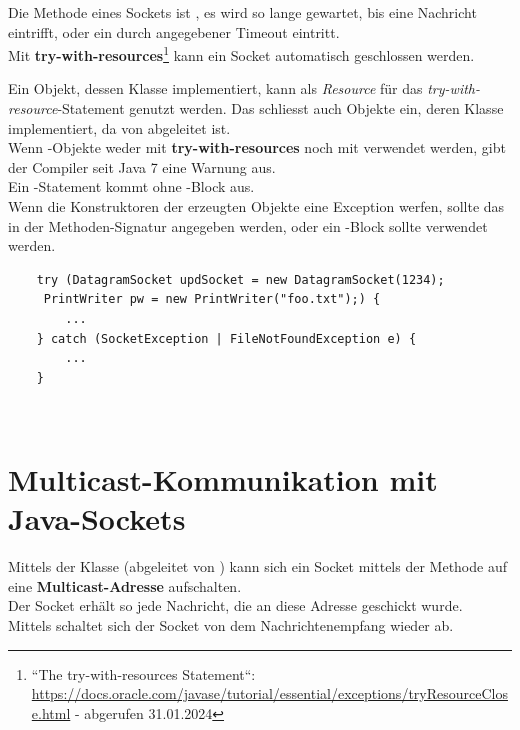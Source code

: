\noindent
Die Methode  eines Sockets ist , es wird so lange gewartet, bis eine Nachricht eintrifft, oder ein durch  angegebener Timeout eintritt.\\

\noindent
Mit \textbf{try-with-resources}\footnote{
    ``The try-with-resources Statement``: \url{https://docs.oracle.com/javase/tutorial/essential/exceptions/tryResourceClose.html} - abgerufen 31.01.2024
} kann ein Socket automatisch geschlossen werden.

\begin{tcolorbox}[enlarge top by=0.5cm,enlarge bottom by=0.5cm]
Ein Objekt, dessen Klasse  implementiert, kann als \textit{Resource} für das \textit{try-with-resource}-Statement genutzt werden.
Das schliesst auch Objekte ein, deren Klasse  implementiert, da  von  abgeleitet ist.\\

\noindent
Wenn -Objekte weder mit \textbf{try-with-resources} noch mit  verwendet werden, gibt der Compiler seit Java 7 eine Warnung aus.\\

\noindent
Ein -Statement kommt ohne -Block aus.\\
Wenn die Konstruktoren der erzeugten Objekte eine Exception werfen, sollte das in der Methoden-Signatur angegeben werden, oder ein -Block sollte verwendet werden.
\end{tcolorbox}

\begin{verbatim}
    try (DatagramSocket updSocket = new DatagramSocket(1234);
     PrintWriter pw = new PrintWriter("foo.txt");) {
        ...
    } catch (SocketException | FileNotFoundException e) {
        ...
    }
\end{verbatim}\\

\section{Multicast-Kommunikation mit Java-Sockets}
Mittels der Klasse  (abgeleitet von ) kann sich ein Socket mittels der Methode  auf eine \textbf{Multicast-Adresse} aufschalten.\\
Der Socket erhält so jede Nachricht, die an diese Adresse geschickt wurde.\\
Mittels  schaltet sich der Socket von dem Nachrichtenempfang wieder ab.

